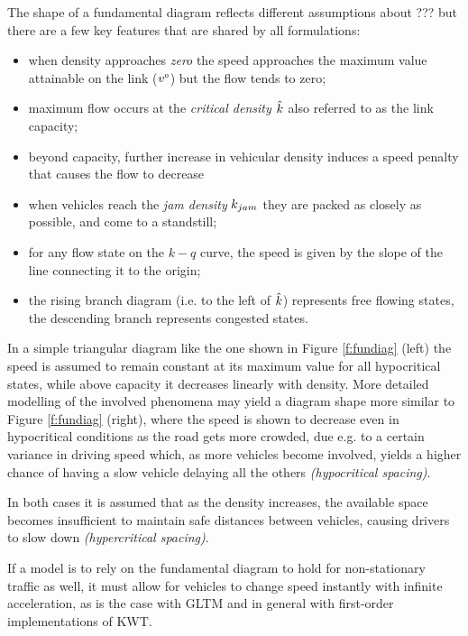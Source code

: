 The shape of a fundamental diagram reflects different assumptions about ??? but there are a few key features that are shared by all formulations:
\begin{itemize}
\item when density approaches \emph{zero} the speed approaches the maximum value attainable on the link ($v^{\scriptscriptstyle{0}}$) but the flow tends to zero;
\item maximum flow occurs at the \emph{critical density $\hat{k}$} also referred to as the link capacity;
\item beyond capacity, further increase in vehicular density induces a speed penalty that causes the flow to decrease
\item when vehicles reach the \emph{jam density} $k_{jam}$ they are packed as closely as possible, and come to a standstill;
\item for any flow state on the $k-q$ curve, the speed is given by the slope of the line connecting it to the origin;
\item the rising branch diagram (i.e. to the left of $\hat{k}$) represents free flowing 
states, the descending branch represents congested states.
\end{itemize}

In a simple triangular diagram like the one shown in Figure \ref{f:fundiag} (left) the speed is assumed to remain constant at its maximum value for all hypocritical states, while above capacity it decreases linearly with density.
More detailed modelling of the involved phenomena may yield a diagram shape more similar to Figure \ref{f:fundiag} (right), where the speed is shown to decrease even in hypocritical conditions as the road gets more crowded, due e.g. to a certain variance in driving speed which, as more vehicles become involved, yields a higher chance of having a slow vehicle delaying all the others \emph{(hypocritical spacing)}.

In both cases it is assumed that as the density increases, the available space becomes insufficient to maintain safe distances between vehicles, causing drivers to slow down \emph{(hypercritical spacing)}.

If a model is to rely on the fundamental diagram to hold for non-stationary traffic as well, it must allow for vehicles to change speed instantly with infinite acceleration, as is the case with GLTM and in general with first-order implementations of KWT.



